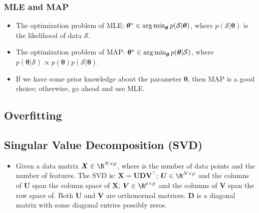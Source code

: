 \subsubsection{MLE and MAP}
    \begin{itemize}
        \item The optimization problem of MLE: $\bm{\theta}^\ast \in  \operatorname{arg\,min}_{\bm{\theta}} p(\mathcal{S} | \bm{\theta})$, where $p(\mathcal{S}| \bm{\theta})$ is the likelihood of data $\mathcal{S}$.
        \item The optimization problem of MAP: $\bm{\theta}^\ast \in  \operatorname{arg\,min}_{\bm{\theta}} p(\bm{\theta} | \mathcal{S})$, where $p(\bm{\theta} | \mathcal{S}) \propto p(\bm{\theta})p(\mathcal{S} | \bm{\theta})$.
        \item If we have some prior knowledge about the parameter $\bm{\theta}$, then MAP is a good choice; otherwise, go ahead and use MLE. 
    \end{itemize}
    

\subsection{Overfitting}




\subsection{Singular Value Decomposition (SVD)}
    \begin{itemize}
        \item Given a data matrix $\bm{X} \in \R^{\ndata \times \nfeat}$, where \ndata is the number of data points and \nfeat the number of features.
        The SVD is: $\bm{X} = \bm{U} \bm{D} \bm{V}^\top$; $\bm{U} \in \R^{\ndata \times \nfeat}$ and the columns of $\bm{U}$ span the column space of $\bm{X}$; $\bm{V} \in \R^{\nfeat \times \nfeat}$ and the columns of $\bm{V}$ span the row space of.
        Both $\bm{U}$ and $\bm{V}$ are orthonormal matrices. 
        $\bm{D}$ is a diagonal matrix with some diagonal entries possibly zeros.
    \end{itemize}
    
    
